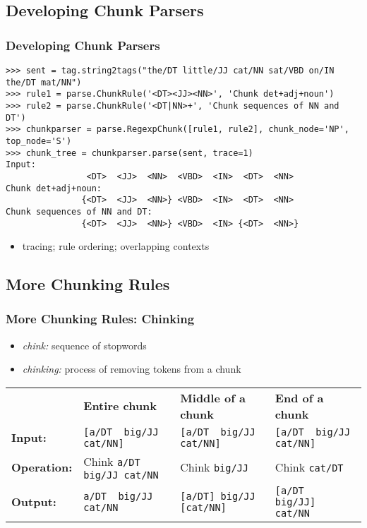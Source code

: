 \documentclass{beamer}             %
\begin{document}
\subsection{Developing Chunk Parsers}

\begin{frame}[fragile]
  \frametitle{Developing Chunk Parsers}
  \tiny

\begin{verbatim}
>>> sent = tag.string2tags("the/DT little/JJ cat/NN sat/VBD on/IN the/DT mat/NN")
>>> rule1 = parse.ChunkRule('<DT><JJ><NN>', 'Chunk det+adj+noun')
>>> rule2 = parse.ChunkRule('<DT|NN>+', 'Chunk sequences of NN and DT')
>>> chunkparser = parse.RegexpChunk([rule1, rule2], chunk_node='NP', top_node='S')
>>> chunk_tree = chunkparser.parse(sent, trace=1)
Input:
                <DT>  <JJ>  <NN>  <VBD>  <IN>  <DT>  <NN> 
Chunk det+adj+noun:
               {<DT>  <JJ>  <NN>} <VBD>  <IN>  <DT>  <NN> 
Chunk sequences of NN and DT:
               {<DT>  <JJ>  <NN>} <VBD>  <IN> {<DT>  <NN>}
\end{verbatim}

\begin{itemize}
  \item tracing; rule ordering; overlapping contexts
\end{itemize}
\end{frame}

\subsection{More Chunking Rules}

\begin{frame}[fragile]
  \frametitle{More Chunking Rules: Chinking}
  \small

  \begin{itemize}
  \item \textit{chink:} sequence of stopwords
  \item \textit{chinking:} process of removing tokens from a chunk
  \end{itemize}

  \tiny

\begin{tabular}{llll}
& \textbf{Entire chunk}
& \textbf{Middle of a chunk}
& \textbf{End of a chunk} \\
\textbf{Input:}
& \verb|[a/DT  big/JJ  cat/NN]|
& \verb|[a/DT  big/JJ  cat/NN]|
& \verb|[a/DT  big/JJ  cat/NN]| \\
\textbf{Operation:}
& Chink \verb|a/DT big/JJ cat/NN|
& Chink \verb|big/JJ|
& Chink \verb|cat/DT| \\
\textbf{Output:}
& \verb|a/DT  big/JJ  cat/NN|
& \verb|[a/DT] big/JJ [cat/NN]|
& \verb|[a/DT  big/JJ] cat/NN|
\end{tabular}
\end{frame}
\end{document}
